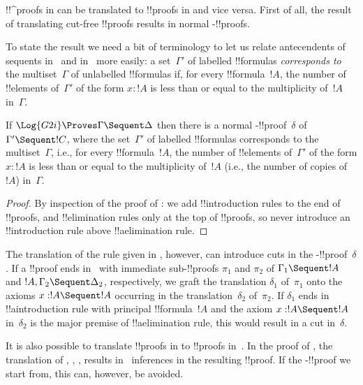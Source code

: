 \documentclass[../../../include/open-logic-section]{subfiles}
\begin{document}


!!^{proof}s in  can be translated to !!{proof}s in 
and vice versa. First of all, the result of translating cut-free
 !!{proof}s results in normal -!!{proof}s.

To state the result we need a bit of terminology to let us relate
antecendents of sequents in~ and in~ more easily: a
set~$\Gamma'$ of labelled !!{formula}s \emph{corresponds to} the
multiset~$\Gamma$ of unlabelled !!{formula}s if, for every
!!{formula}~$!A$, the number of !!{element}s of~$\Gamma'$ of the form
$x : !A$ is less than or equal to the multiplicity of~$!A$
in~$\Gamma$.

\begin{cor}
If $\Log{G2i} \Proves \Gamma \Sequent \Delta$ then there is a normal
-!!{proof}~$\delta$ of $\Gamma' \Sequent !C$, where the
set~$\Gamma'$ of labelled !!{formula}s corresponds to the
multiset~$\Gamma$, i.e., for every !!{formula}~$!A$, the number of
!!{element}s of~$\Gamma'$ of the form $x : !A$ is less than or equal
to the multiplicity of~$!A$ (i.e., the number of copies of~$!A$)
in~$\Gamma$.
\end{cor}

\begin{proof}
By inspection of the proof of : we
add !!{introduction} rules to the end of !!{proof}s, and
!!{elimination} rules only at the top of !!{proof}s, so never
introduce an !!{introduction} rule above !!a{elimination} rule.
\end{proof}

The translation of the \Cut{} rule given in
, however, can introduce cuts in the
-!!{proof}~$\delta$. If a  !!{proof} ends in~\Cut{}
with immediate sub-!!{proof}s $\pi_1$ and $\pi_2$ of $\Gamma_1
\Sequent !A$ and $!A, \Gamma_2 \Sequent \Delta_2$, respectively, we
graft the translation $\delta_1$ of~$\pi_1$ onto the axioms $x:!A
\Sequent !A$ occurring in the translation~$\delta_2$ of~$\pi_2$. If
$\delta_1$ ends in !!a{introduction} rule with principal
!!{formula}~$!A$ and the axiom $x:!A \Sequent !A$ in~$\delta_2$ is the
major premise of !!a{elimination} rule, this would result in a cut
in~$\delta$.

It is also possible to translate !!{proof}s in  to !!{proof}s
in~. In the proof of , the
translation of \Elim{\land}, \Elim{\lif}, \Elim{\lnot},
\Elim{\lforall} results in~\Cut{} inferences in the resulting
 !!{proof}. If the -!!{proof} we start from, this
can, however, be avoided.
\end{document}
